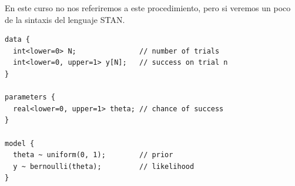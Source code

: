 \documentclass[
  12pt,
]{book}
\newenvironment{Shaded}{\begin{snugshade}}{\end{snugshade}}
\newcommand{\DataTypeTok}[1]{\textcolor[rgb]{0.13,0.29,0.53}{#1}}
\newcommand{\DecValTok}[1]{\textcolor[rgb]{0.00,0.00,0.81}{#1}}
\newcommand{\KeywordTok}[1]{\textcolor[rgb]{0.13,0.29,0.53}{\textbf{#1}}}
\newcommand{\NormalTok}[1]{#1}
\newcommand{\OperatorTok}[1]{\textcolor[rgb]{0.81,0.36,0.00}{\textbf{#1}}}
\newcommand{\StringTok}[1]{\textcolor[rgb]{0.31,0.60,0.02}{#1}}
\theoremstyle{definition}
\theoremstyle{definition}
\theoremstyle{definition}
\theoremstyle{remark}
\begin{document}
En este curso no nos referiremos a este procedimiento, pero si veremos un poco de la sintaxis del lenguaje STAN.

\begin{verbatim}
data {
  int<lower=0> N;               // number of trials
  int<lower=0, upper=1> y[N];   // success on trial n
}

parameters {
  real<lower=0, upper=1> theta; // chance of success
}

model {
  theta ~ uniform(0, 1);        // prior
  y ~ bernoulli(theta);         // likelihood
}
\end{verbatim}

\begin{Shaded}
\end{Shaded}
\end{document}
